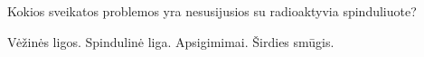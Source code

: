 \question Kokios sveikatos problemos yra nesusijusios su radioaktyvia spinduliuote? \begin{choices}
    \choice Vėžinės ligos.
    \choice Spindulinė liga.
    \choice Apsigimimai.
    \choice Širdies smūgis.
\end{choices}